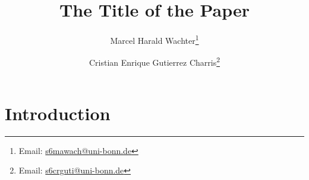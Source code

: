\documentclass[a4paper,12pt]{article}
\author{Marcel Harald Wachter\thanks{Email: \href{mailto:s6mawach@uni-bonn.de}{s6mawach@uni-bonn.de}} \and Cristian Enrique Gutierrez Charris\thanks{Email: \href{mailto:s6crguti@uni-bonn.de}{s6crguti@uni-bonn.de}}}
\title{The Title of the Paper}
\begin{document}
\maketitle
\thispagestyle{empty}

\begin{singlespace}
\begin{abstract}

\end{abstract}
\end{singlespace}

\newpage
{}
\section{Introduction}
\end{document}
